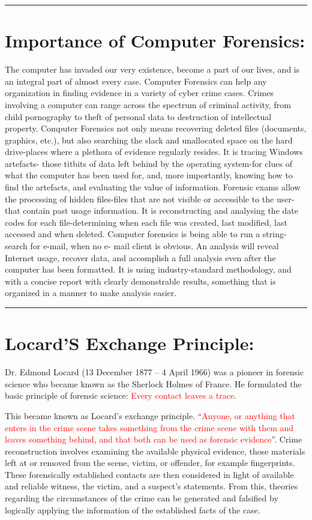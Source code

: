 \documentclass[british]{article}
\begin{document}
\rule[0.5ex]{0.75\columnwidth}{1pt}

\section{Importance of Computer Forensics:}

The computer has invaded our very existence, become a part of our
lives, and is an integral part of almost every case. Computer Forensics
can help any organization in finding evidence in a variety of cyber
crime cases. Crimes involving a computer can range across the spectrum
of criminal activity, from child pornography to theft of personal
data to destruction of intellectual property. Computer Forensics not
only means recovering deleted files (documents, graphics, etc.), but
also searching the slack and unallocated space on the hard drive-places
where a plethora of evidence regularly resides. It is tracing Windows
artefacts- those titbits of data left behind by the operating system-for
clues of what the computer has been used for, and, more importantly,
knowing how to find the artefacts, and evaluating the value of information.
Forensic exams allow the processing of hidden files-files that are
not visible or accessible to the user-that contain past usage information.
It is reconstructing and analysing the date codes for each file-determining
when each file was created, last modified, last accessed and when
deleted. Computer forensics is being able to run a string-search for
e-mail, when no e- mail client is obvious. An analysis will reveal
Internet usage, recover data, and accomplish a full analysis even
after the computer has been formatted. It is using industry-standard
methodology, and with a concise report with clearly demonstrable results,
something that is organized in a manner to make analysis easier.

\rule[0.5ex]{0.75\columnwidth}{1pt}

\section{Locard\textquoteright S Exchange Principle:}

Dr. Edmond Locard (13 December 1877 -- 4 April 1966) was a pioneer
in forensic science who became known as the \textquotedbl Sherlock
Holmes of France\textquotedbl . He formulated the basic principle
of forensic science: \textquotedbl\textcolor{red}{Every contact leaves
a trace}\textquotedbl .

This became known as Locard's exchange principle. ``\textcolor{red}{Anyone,
or anything that enters in the crime scene takes something from the
crime scene with them and leaves something behind, and that both can
be used as forensic evidence}''. Crime reconstruction involves examining
the available physical evidence, those materials left at or removed
from the scene, victim, or offender, for example fingerprints. These
forensically established contacts are then considered in light of
available and reliable witness, the victim, and a suspect's statements.
From this, theories regarding the circumstances of the crime can be
generated and falsified by logically applying the information of the
established facts of the case.
\end{document}
